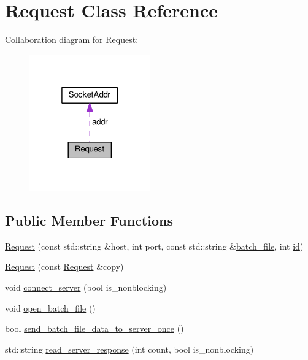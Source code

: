 \hypertarget{classRequest}{}\section{Request Class Reference}
\label{classRequest}


Collaboration diagram for Request\+:\nopagebreak
\begin{figure}[H]
\begin{center}
\leavevmode
\includegraphics[width=148pt]{classRequest__coll__graph}
\end{center}
\end{figure}
\subsection*{Public Member Functions}
\begin{DoxyCompactItemize}
\item 
\hyperlink{classRequest_a3486ae358bb5f313cf671c1e77699d09}{Request} (const std\+::string \&host, int port, const std\+::string \&\hyperlink{classRequest_aa5246e928a295ef769e474312d558b85}{batch\+\_\+file}, int \hyperlink{classRequest_a026538b5d27774177b27d0552d25fa13}{id})
\item 
\hyperlink{classRequest_aab943afe9bcc179e2ed7b80157e8ca88}{Request} (const \hyperlink{classRequest}{Request} \&copy)
\item 
void \hyperlink{classRequest_a5c25c20e0d7e7fc3d76a14fec39fd0e9}{connect\+\_\+server} (bool is\+\_\+nonblocking)
\item 
void \hyperlink{classRequest_adb783bcf7a5ecda4db300257c4ccf660}{open\+\_\+batch\+\_\+file} ()
\item 
bool \hyperlink{classRequest_af06e40284c6ef025e1ef464629ae951f}{send\+\_\+batch\+\_\+file\+\_\+data\+\_\+to\+\_\+server\+\_\+once} ()
\item 
std\+::string \hyperlink{classRequest_a5d45baa51e213afa669971f7b9cb5723}{read\+\_\+server\+\_\+response} (int count, bool is\+\_\+nonblocking)
\end{DoxyCompactItemize}
